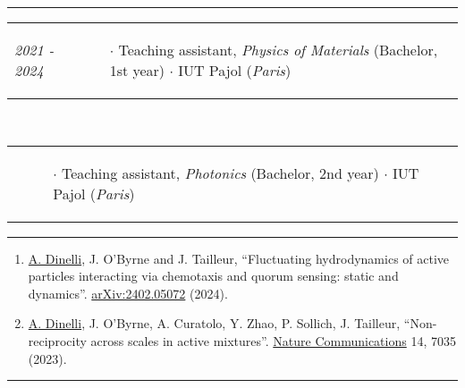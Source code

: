 \documentclass{scrartcl}
\newcommand{\NewItemEntry}[2]{
  \noindent
  \begin{tabular}[r]{p{2.5cm} p{14.0cm}}
    \-\hspace{0.5cm} \small \textit{#1}
    &
    \begin{itemize}
      \vspace{-0.65cm}
      \item[$\cdot$] #2
    \end{itemize}
  \end{tabular}
  \vspace{-0.2cm}
}
\begin{document}
\begin{cv}{}
\begin{tabular}{p{4cm}|p{14cm}}
\end{tabular}
\vspace{1em}

\par\noindent\rule{\textwidth}{0.4pt}

\vspace{1.5em}










\noindent{}\vspace{1em}
\def\v{-0.1cm}

\NewItemEntry{2021 - 2024}{Teaching assistant, \textit{Physics of Materials} (Bachelor, 1st year) $\cdotp$ IUT Pajol (\textit{Paris})}\\[\v]
\NewItemEntry{}{Teaching assistant, \textit{Photonics} (Bachelor, 2nd year) $\cdotp$ IUT Pajol (\textit{Paris})}

\vspace{1em}

\par\noindent\rule{\textwidth}{0.4pt}

\vspace{1.5em}


\newpage


\noindent{}\vspace{1em}
\small
\begin{enumerate}
\item \underline{A. Dinelli}, J. O’Byrne and J. Tailleur, ``Fluctuating hydrodynamics of active particles interacting via chemotaxis and quorum sensing: static and dynamics''. \href{https://arxiv.org/abs/2402.05072}{arXiv:2402.05072} (2024).
\item \underline{A. Dinelli}, J. O’Byrne, A. Curatolo, Y. Zhao, P. Sollich, J. Tailleur, ``Non-reciprocity across scales in active mixtures''. \href{https://doi.org/10.1038/s41467-023-42713-5}{Nature Communications} 14, 7035 (2023). 
\end{enumerate}
  

\par\noindent\rule{\textwidth}{0.4pt}

\vspace{1.5em}







\end{cv}
\end{document}
